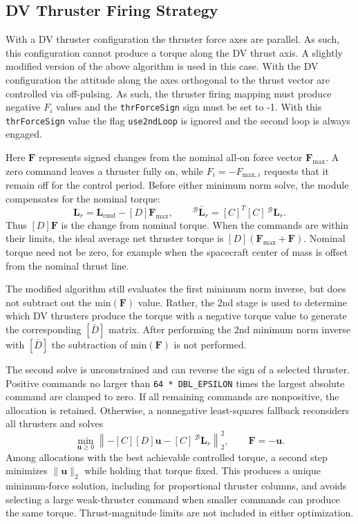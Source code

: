 \subsection{DV Thruster Firing Strategy}\label{sec:DVStrategy}
With a DV thruster configuration the thruster force axes are parallel.  As such, this configuration cannot produce a torque along the DV thrust axis.  A slightly modified version of the above algorithm is used in this case.  With the DV configuration the attitude along the axes orthogonal to the thrust vector are controlled via off-pulsing.  As such, the thruster firing mapping must produce negative $F_{i}$ values and the {\tt thrForceSign} sign must be set to -1.  With this  {\tt thrForceSign} value the flag {\tt use2ndLoop} is ignored and the second loop is always engaged.

Here $\bm F$ represents signed changes from the nominal all-on force vector $\bm F_{\text{max}}$.  A zero command leaves a thruster fully on, while $F_i = -F_{\text{max},i}$ requests that it remain off for the control period.  Before either minimum norm solve, the module compensates for the nominal torque:
\begin{equation*}
	\bm L_r = \bm L_{\text{cmd}} - [D]\bm F_{\text{max}},
	\qquad {}^{\mathcal{B}}\bar{\bm L}_r = [C]^T[C]\,{}^{\mathcal{B}}\bm L_r.
\end{equation*}
Thus $[D]\bm F$ is the change from nominal torque.  When the commands are within their limits, the ideal average net thruster torque is $[D](\bm F_{\text{max}} + \bm F)$.  Nominal torque need not be zero, for example when the spacecraft center of mass is offset from the nominal thrust line.

The modified algorithm still evaluates the first minimum norm inverse, but does not subtract out the $\text{min}(\bm F)$ value.  Rather, the 2nd stage is used to determine which DV thrusters produce the torque with a negative torque value to generate the corresponding $[\bar D]$ matrix.  After performing the 2nd minimum norm inverse with $[\bar D]$ the subtraction of  $\text{min}(\bm F)$ is not performed.

The second solve is unconstrained and can reverse the sign of a selected thruster.  Positive commands no larger than {\tt 64 * DBL\_EPSILON} times the largest absolute command are clamped to zero.  If all remaining commands are nonpositive, the allocation is retained.  Otherwise, a nonnegative least-squares fallback reconsiders all thrusters and solves
\begin{equation*}
    \min_{\bm u\geq 0}\left\|-[C][D]\bm u-[C]\,{}^{\mathcal{B}}\bm L_r\right\|_2^2,
    \qquad \bm F=-\bm u.
\end{equation*}
Among allocations with the best achievable controlled torque, a second step minimizes $\|\bm u\|_2$ while holding that torque fixed.  This produces a unique minimum-force solution, including for proportional thruster columns, and avoids selecting a large weak-thruster command when smaller commands can produce the same torque.  Thrust-magnitude limits are not included in either optimization.

